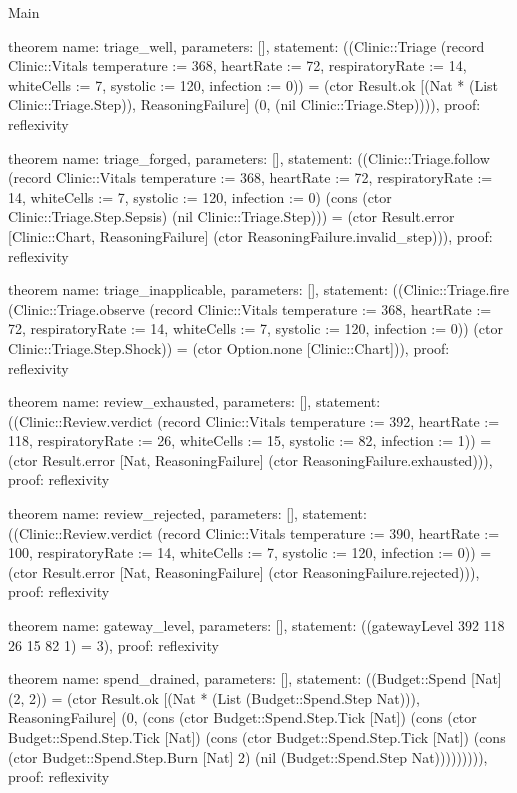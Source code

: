 \begin{lexlean}{Main}
\begin{semanticmodule}
theorem{
  name: triage_well,
  parameters: [],
  statement: ((Clinic::Triage (record Clinic::Vitals {temperature := 368, heartRate := 72, respiratoryRate := 14, whiteCells := 7, systolic := 120, infection := 0})) = (ctor Result.ok [(Nat * (List Clinic::Triage.Step)), ReasoningFailure] (0, (nil Clinic::Triage.Step)))),
  proof: reflexivity{}
}

theorem{
  name: triage_forged,
  parameters: [],
  statement: ((Clinic::Triage.follow (record Clinic::Vitals {temperature := 368, heartRate := 72, respiratoryRate := 14, whiteCells := 7, systolic := 120, infection := 0}) (cons (ctor Clinic::Triage.Step.Sepsis) (nil Clinic::Triage.Step))) = (ctor Result.error [Clinic::Chart, ReasoningFailure] (ctor ReasoningFailure.invalid_step))),
  proof: reflexivity{}
}

theorem{
  name: triage_inapplicable,
  parameters: [],
  statement: ((Clinic::Triage.fire (Clinic::Triage.observe (record Clinic::Vitals {temperature := 368, heartRate := 72, respiratoryRate := 14, whiteCells := 7, systolic := 120, infection := 0})) (ctor Clinic::Triage.Step.Shock)) = (ctor Option.none [Clinic::Chart])),
  proof: reflexivity{}
}

theorem{
  name: review_exhausted,
  parameters: [],
  statement: ((Clinic::Review.verdict (record Clinic::Vitals {temperature := 392, heartRate := 118, respiratoryRate := 26, whiteCells := 15, systolic := 82, infection := 1})) = (ctor Result.error [Nat, ReasoningFailure] (ctor ReasoningFailure.exhausted))),
  proof: reflexivity{}
}

theorem{
  name: review_rejected,
  parameters: [],
  statement: ((Clinic::Review.verdict (record Clinic::Vitals {temperature := 390, heartRate := 100, respiratoryRate := 14, whiteCells := 7, systolic := 120, infection := 0})) = (ctor Result.error [Nat, ReasoningFailure] (ctor ReasoningFailure.rejected))),
  proof: reflexivity{}
}

theorem{
  name: gateway_level,
  parameters: [],
  statement: ((gatewayLevel 392 118 26 15 82 1) = 3),
  proof: reflexivity{}
}

theorem{
  name: spend_drained,
  parameters: [],
  statement: ((Budget::Spend [Nat] (2, 2)) = (ctor Result.ok [(Nat * (List (Budget::Spend.Step Nat))), ReasoningFailure] (0, (cons (ctor Budget::Spend.Step.Tick [Nat]) (cons (ctor Budget::Spend.Step.Tick [Nat]) (cons (ctor Budget::Spend.Step.Tick [Nat]) (cons (ctor Budget::Spend.Step.Burn [Nat] 2) (nil (Budget::Spend.Step Nat))))))))),
  proof: reflexivity{}
}


\end{semanticmodule}
\end{lexlean}
